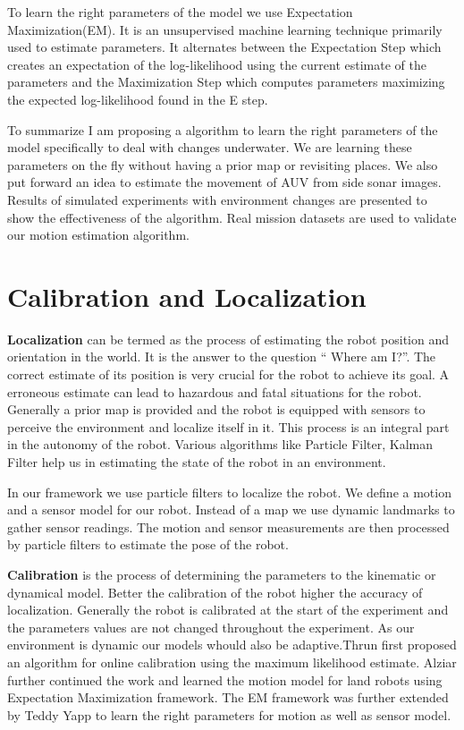 \documentclass[12pt]{dalcsthesis}
\begin{document}
To learn the right parameters of the model we use Expectation Maximization(EM). It is an unsupervised machine learning technique primarily used to estimate parameters. It alternates between the Expectation Step which creates an expectation of the log-likelihood using the current estimate of the parameters and the Maximization Step which computes parameters maximizing the expected log-likelihood found in the E step. 

To summarize I am proposing a algorithm to learn the right parameters of the model specifically to deal with changes underwater. We are learning these parameters on the fly without having a prior map or revisiting places. We also put forward an idea to estimate the movement of AUV from side sonar images. Results of simulated experiments with environment changes are presented to show the effectiveness of the algorithm. Real mission datasets are used to validate our motion estimation algorithm. 
\section{Calibration and Localization}
\textbf{Localization} can be termed as the process of estimating the robot position and orientation in the world. It is the answer to the question “ Where am I?”. The correct estimate of its position is very crucial for the robot to achieve its goal. A erroneous estimate can lead to hazardous and fatal situations for the robot. Generally a prior map is provided and the robot is equipped with sensors to perceive the environment and localize itself in it. This process is an integral part in the autonomy of the robot. Various algorithms like Particle Filter, Kalman Filter help us in estimating the state of the robot in an environment. 

In our framework we use particle filters to localize the robot. We define a motion and a sensor model for our robot. Instead of a map we use dynamic landmarks to gather sensor readings. The motion and sensor measurements are then processed by particle filters to estimate the pose of the robot. 

\textbf{Calibration} is the process of determining the parameters to the kinematic or dynamical model. Better the calibration of the robot higher the accuracy of localization. Generally the robot is calibrated at the start of the experiment and the parameters values are not changed throughout the experiment. As our environment is dynamic our models whould also be adaptive.Thrun first proposed an algorithm for online calibration using the maximum likelihood estimate. Alziar further continued the work and learned the motion model for land robots using Expectation Maximization framework. The EM framework was further extended by Teddy Yapp to learn the right parameters for motion as well as sensor model. 
\end{document}
